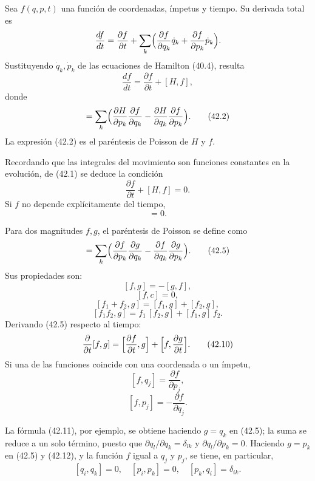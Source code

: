 \documentclass[12pt]{article}
\begin{document}
Sea \(f(q,p,t)\) una función de coordenadas, ímpetus y tiempo. Su derivada total es
\[
\frac{df}{dt}
= \frac{\partial f}{\partial t}
+ \sum_k\Bigl(\frac{\partial f}{\partial q_k}\dot q_k
           + \frac{\partial f}{\partial p_k}\dot p_k\Bigr).
\]
Sustituyendo \(\dot q_k,\dot p_k\) de las ecuaciones de Hamilton (40.4), resulta
\begin{equation}
\frac{df}{dt} = \frac{\partial f}{\partial t} + [H,f],
\tag{42.1}
\end{equation}
donde
\begin{equation}
[H,f]
= \sum_k\Bigl(
    \frac{\partial H}{\partial p_k}\frac{\partial f}{\partial q_k}
  - \frac{\partial H}{\partial q_k}\frac{\partial f}{\partial p_k}
  \Bigr).
\tag{42.2}
\end{equation}
La expresión (42.2) es el paréntesis de Poisson de \(H\) y \(f\).

Recordando que las integrales del movimiento son funciones constantes en la evolución, de (42.1) se deduce la condición
\begin{equation}
\frac{\partial f}{\partial t} + [H,f] = 0.
\tag{42.3}
\end{equation}
Si \(f\) no depende explícitamente del tiempo,
\begin{equation}
[H,f] = 0.
\tag{42.4}
\end{equation}

Para dos magnitudes \(f,g\), el paréntesis de Poisson se define como
\begin{equation}
[f,g]
= \sum_k\Bigl(
    \frac{\partial f}{\partial p_k}\frac{\partial g}{\partial q_k}
  - \frac{\partial f}{\partial q_k}\frac{\partial g}{\partial p_k}
  \Bigr).
\tag{42.5}
\end{equation}
Sus propiedades son:
\[
[f,g] = -[g,f],
\tag{42.6}
\]
\[
[f,c] = 0,
\tag{42.7}
\]
\[
[f_1+f_2,g] = [f_1,g] + [f_2,g],
\tag{42.8}
\]
\[
[f_1f_2,g] = f_1\,[f_2,g] + [f_1,g]\,f_2.
\tag{42.9}
\]
Derivando (42.5) respecto al tiempo:
\[
\frac{\partial}{\partial t}[f,g]
= \Bigl[\frac{\partial f}{\partial t},g\Bigr]
+ \Bigl[f,\frac{\partial g}{\partial t}\Bigr].
\tag{42.10}
\]
Si una de las funciones coincide con una coordenada o un ímpetu,
\[
[f,q_j] = \frac{\partial f}{\partial p_j},
\tag{42.11}
\]
\[
[f,p_j] = -\frac{\partial f}{\partial q_j}.
\tag{42.12}
\]

La fórmula (42.11), por ejemplo, se obtiene haciendo \(g=q_k\) en (42.5); la suma se reduce a un solo término, puesto que \(\partial q_l/\partial q_k=\delta_{lk}\) y \(\partial q_l/\partial p_k=0\). Haciendo \(g=p_k\) en (42.5) y (42.12), y la función \(f\) igual a \(q_j\) y \(p_j\), se tiene, en particular,
\[
[q_i,q_k]=0,\quad [p_i,p_k]=0,\quad [p_k,q_i]=\delta_{ik}.
\tag{42.13}
\]
\end{document}
